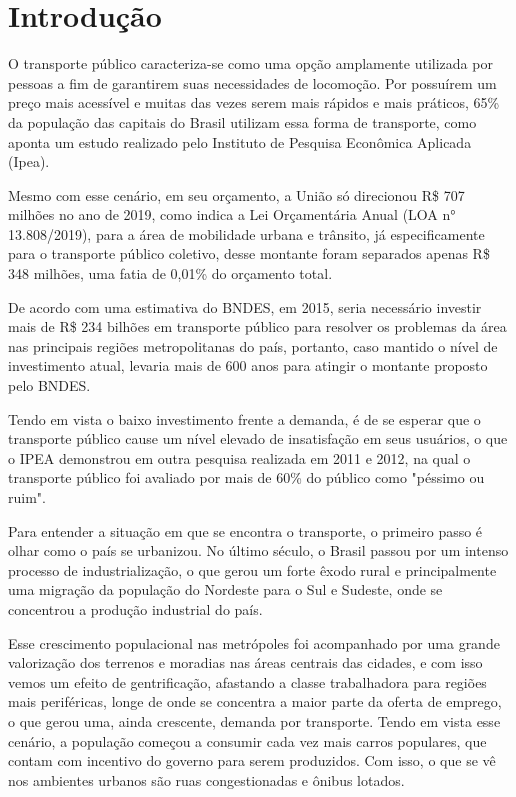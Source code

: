 \chapter{Introdução}
\label{Cap:Intro}

\indent
\par O transporte público caracteriza-se como uma opção amplamente utilizada por pessoas a fim de garantirem suas necessidades de locomoção. Por possuírem um preço mais acessível e muitas das vezes serem mais rápidos e mais práticos, 65\% da população das capitais do Brasil utilizam essa forma de transporte, como aponta um estudo realizado pelo Instituto de Pesquisa Econômica Aplicada (Ipea).
\par Mesmo com esse cenário, em seu orçamento, a União só direcionou R\$ 707 milhões no ano de 2019, como indica a Lei Orçamentária Anual (LOA n° 13.808/2019), para a área de mobilidade urbana e trânsito, já especificamente para o transporte público coletivo, desse montante foram separados apenas R\$ 348 milhões, uma fatia de 0,01\% do orçamento total.
\par De acordo com uma estimativa do BNDES, em 2015, seria necessário investir mais de R\$ 234 bilhões em transporte público para resolver os problemas da área nas principais regiões metropolitanas do país, portanto, caso mantido o nível de investimento atual, levaria mais de 600 anos para atingir o montante proposto pelo BNDES.
\par Tendo em vista o baixo investimento frente a demanda, é de se esperar que o transporte público cause um nível elevado de insatisfação em seus usuários, o que o IPEA demonstrou em outra pesquisa realizada em 2011 e 2012, na qual o transporte público foi avaliado por mais de 60\% do público como "péssimo ou ruim".
\par Para entender a situação em que se encontra o transporte, o primeiro passo é olhar como o país se urbanizou. No último século, o Brasil passou por um intenso processo de industrialização, o que gerou um forte êxodo rural e principalmente uma migração da população do Nordeste para o Sul e Sudeste, onde se concentrou a produção industrial do país.
\par Esse crescimento populacional nas metrópoles foi acompanhado por uma grande valorização dos terrenos e moradias nas áreas centrais das cidades, e com isso vemos um efeito de gentrificação, afastando a classe trabalhadora para regiões mais periféricas, longe de onde se concentra a maior parte da oferta de emprego, o que gerou uma, ainda crescente, demanda por transporte. Tendo em vista esse cenário, a população começou a consumir cada vez mais carros populares, que contam com incentivo do governo para serem produzidos. Com isso, o que se vê nos ambientes urbanos são ruas congestionadas e ônibus lotados.
